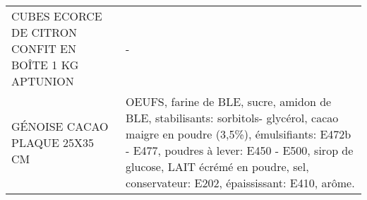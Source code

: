\begin{longtable}{p{5cm}p{10cm}}
                                                     CUBES ECORCE DE CITRON CONFIT EN BOÎTE 1 KG APTUNION &                                                                                                                                                                                                                                                                                                                                                                                                                                                                                                                                                                                                                                                                                                                                                                                                                                                                                                                                                                                                                                        - \\
                                                                            GÉNOISE CACAO PLAQUE 25X35 CM &                                                                                                                                                                                                                                                                                                                                                                                                                                                                                                                                                                                                                                                                                                                                                                     OEUFS, farine de BLE, sucre, amidon de BLE, stabilisants: sorbitols- glycérol, cacao maigre en poudre (3,5\%), émulsifiants: E472b - E477, poudres à lever: E450 - E500, sirop de glucose, LAIT écrémé en poudre, sel, conservateur: E202, épaississant: E410, arôme. \\

\end{longtable}
